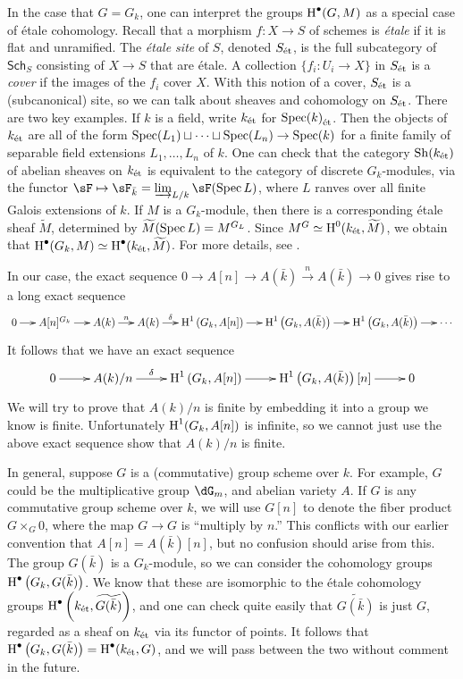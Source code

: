 \documentclass{article}
\begin{document}
In the case that $G=G_k$, one can interpret the groups $\operatorname{H}^\bullet(G,M)$ as a 
special case of \'etale cohomology. Recall that a morphism $f:X\to S$ of 
schemes is \emph{\'etale} if it is flat and unramified. The \emph{\'etale 
site} of $S$, denoted ${S}_\textnormal{\'et}$, is the full subcategory of $\mathsf{Sch}_S$ 
consisting of $X\to S$ that are \'etale. A collection $\{f_i:U_i\to X\}$ in 
${S}_\textnormal{\'et}$ is a \emph{cover} if the images of the $f_i$ cover $X$. With this 
notion of a cover, ${S}_\textnormal{\'et}$ is a (subcanonical) site, so we can talk about 
sheaves and cohomology on ${S}_\textnormal{\'et}$. There are two key examples. If $k$ is a 
field, write ${k}_\textnormal{\'et}$ for ${\operatorname{Spec}(k)}_\textnormal{\'et}$. Then the objects of ${k}_\textnormal{\'et}$ are all 
of the form $\operatorname{Spec}(L_1)\sqcup \cdots \sqcup \operatorname{Spec}(L_n)\to \operatorname{Spec}(k)$ for a 
finite family of separable field extensions $L_1,\dots,L_n$ of $k$. One can 
check that the category $\operatorname{Sh}({k}_\textnormal{\'et})$ of abelian sheaves on ${k}_\textnormal{\'et}$ is 
equivalent to the category of discrete $G_k$-modules, via the functor 
$\sF\mapsto \sF_{\bar k} = \varinjlim_{L/k} \sF(\spec L)$, where $L$ ranves 
over all finite Galois extensions of $k$. If $M$ is a $G_k$-module, then there 
is a corresponding \'etale sheaf $\widetilde M$, determined by 
$\widetilde M(\operatorname{Spec} L) = M^{G_L}$. Since 
$M^G\simeq \operatorname{H}^0({k}_\textnormal{\'et},\widetilde M)$, we obtain that 
$\operatorname{H}^\bullet(G_k,M) \simeq \operatorname{H}^\bullet({k}_\textnormal{\'et}, \widetilde M)$. For more details, 
see \cite[I 2.4]{de77}. 

In our case, the exact sequence 
$0\to A[n]\to A(\bar k) \xrightarrow n A(\bar k) \to 0$ gives rise to a long 
exact sequence 
\[\xymatrix@=0.5cm{
  0 \ar[r] 
    & A[n]^{G_k} \ar[r] 
    & A(k) \ar[r]^-n 
    & A(k) \ar[r]^-\delta 
    & \h^1\left(G_k,A[n]\right) \ar[r] 
    & \h^1\left(G_k,A(\bar k)\right) \ar[r] 
    & \h^1\left(G_k, A(\bar k)\right) \ar[r] 
    & \cdots
}\]
It follows that we have an exact sequence 
\[\xymatrix{
  0 \ar[r] 
    & A(k) / n \ar[r]^-\delta
    & \h^1\left(G_k,A[n]\right) \ar[r] 
    & \h^1\left(G_k,A(\bar k)\right)[n] \ar[r]
    & 0
}\]
We will try to prove that $A(k)/ n$ is finite by embedding it into a group 
we know is finite. Unfortunately $\operatorname{H}^1(G_k, A[n])$ is infinite, so we cannot 
just use the above exact sequence show that $A(k)/n$ is finite. 

In general, suppose $G$ is a (commutative) group scheme over $k$. For example, 
$G$ could be the multiplicative group $\dG_m$, and abelian variety $A$. If 
$G$ is any commutative group scheme over $k$, we will use $G[n]$ to denote the 
fiber product $G\times_G 0$, where the map $G\to G$ is ``multiply by $n$.'' 
This conflicts with our earlier convention that $A[n]=A(\bar k)[n]$, but 
no confusion should arise from this. The group $G(\bar k)$ is 
a $G_k$-module, so we can consider the cohomology groups 
$\operatorname{H}^\bullet\left(G_k, G(\bar k)\right)$. We know that these are isomorphic to 
the \'etale cohomology groups 
$\operatorname{H}^\bullet\left({k}_\textnormal{\'et}, \widetilde{G(\bar k)}\right)$, and one can check quite 
easily that $\widetilde{G(\bar k)}$ is just $G$, regarded as a sheaf on ${k}_\textnormal{\'et}$ 
via its functor of points. It follows that 
$\operatorname{H}^\bullet\left(G_k, G(\bar k)\right) = \operatorname{H}^\bullet({k}_\textnormal{\'et}, G)$, and we will 
pass between the two without comment in the future. 
\end{document}
